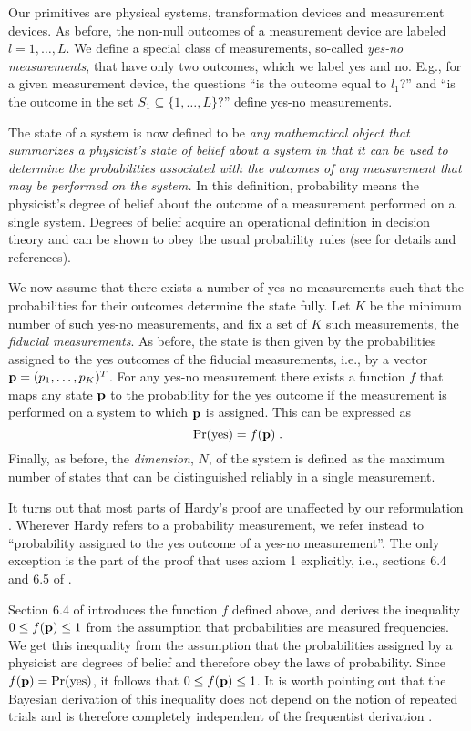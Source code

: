 \documentclass[pra,12pt,tightenlines]{revtex4}
\begin{document}
Our primitives are physical systems, transformation devices and measurement
devices. As before, the non-null outcomes of a measurement device are labeled
$l=1,\ldots,L$. We define a special class of  measurements, so-called {\it
  yes-no measurements}, that have only two outcomes, which we label yes and
no.  E.g., for a given measurement device, the questions
``is the outcome equal to $l_1$?'' and ``is the outcome in the set
$S_1\subseteq\{1,\ldots,L\}$?'' define yes-no measurements. 

The state of a system is now defined to be {\it any mathematical object that
  summarizes a physicist's state of belief about a system in that it can be
  used to determine the probabilities associated with the outcomes of any
  measurement that may be performed on the system.} In this definition,
probability means the physicist's degree of belief about the outcome of a
measurement performed on a single system. Degrees of belief acquire an
operational definition in decision theory and can be shown to obey the usual
probability rules (see \cite{Caves2002a} for details and references).

We now assume that there exists a number of yes-no measurements such that the
probabilities for their outcomes determine the state fully. Let $K$ be the
minimum number of such yes-no measurements, and fix a set of $K$ such
measurements, the {\it fiducial measurements}. As before, the state is then
given by the probabilities assigned to the yes outcomes of the fiducial
measurements, i.e., by a vector ${\bf p}=(p_1,\ldots,p_K)^T$. For any yes-no
measurement there exists a function $f$ that maps any state ${\bf p}$ to the
probability for the yes outcome if the measurement is performed on a system
to which ${\bf p}$ is assigned. This can be expressed as
\begin{equation}
\Pr({\rm yes})=f(\p) \;.
\end{equation}
Finally, as before, the {\it dimension}, $N$, of the system is defined as the
maximum number of states that can be distinguished reliably in a single
measurement. 

It turns out that most parts of Hardy's proof are unaffected by our
reformulation \cite{Hardy-private}. Wherever
Hardy refers to a probability measurement, we refer instead to ``probability
assigned to the yes outcome of a yes-no measurement''. The only exception is
the part of the proof that uses axiom 1 explicitly, i.e., sections 6.4 and 6.5
of \cite{Hardy-0101}.

Section 6.4 of \cite{Hardy-0101} introduces the function $f$ defined above,
and derives the inequality $0\le f({\bf p})\le1$ from the assumption that
probabilities are measured frequencies. We get this inequality from the
assumption that the probabilities assigned by a physicist are degrees of
belief and therefore obey the laws of probability. Since $f({\bf p})=\Pr({\rm yes})$, it
follows that $0\le f({\bf p})\le1$. It is worth pointing out that the Bayesian
derivation of this inequality does not depend on the notion
of repeated trials and is therefore completely independent of the frequentist
derivation \cite{Caves2002a}.
\end{document}
